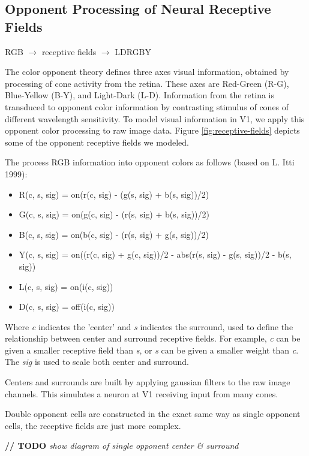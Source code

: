 \documentclass[journal,onecolumn]{IEEEtran}
\begin{document}
\subsection{Opponent Processing of Neural Receptive Fields}

RGB $\rightarrow$ receptive fields $\rightarrow$ LDRGBY

The color opponent theory defines three axes visual information, obtained by processing of cone activity from the retina. These axes are Red-Green (R-G), Blue-Yellow (B-Y), and Light-Dark (L-D). Information from the retina is transduced to opponent color information by contrasting stimulus of cones of different wavelength sensitivity. To model visual information in V1, we apply this opponent color processing to raw image data. Figure \ref{fig:receptive-fields} depicts some of the opponent receptive fields we modeled.

The process RGB information into opponent colors as follows (based on L. Itti 1999):
\begin{itemize}
    \item R(c, s, sig) = on(r(c, sig) - (g(s, sig) + b(s, sig))/2)
    \item G(c, s, sig) = on(g(c, sig) - (r(s, sig) + b(s, sig))/2)
    \item B(c, s, sig) = on(b(c, sig) - (r(s, sig) + g(s, sig))/2)
    \item Y(c, s, sig) = on((r(c, sig) + g(c, sig))/2 - abs(r(s, sig) - g(s, sig))/2 - b(s, sig))
    \item L(c, s, sig) = on(i(c, sig))
    \item D(c, s, sig) = off(i(c, sig))
\end{itemize}
Where \textit{c} indicates the 'center' and \textit{s} indicates the surround, used to define the relationship between center and surround receptive fields. For example, \textit{c} can be given a smaller receptive field than \textit{s}, or \textit{s} can be given a smaller weight than \textit{c}. The \textit{sig} is used to scale both center and surround. 

Centers and surrounds are built by applying gaussian filters to the raw image channels. This simulates a neuron at V1 receiving input from many cones.

Double opponent cells are constructed in the exact same way as single opponent cells, the receptive fields are just more complex.

\textbf{// TODO} \textit{show diagram of single opponent center \& surround}
\end{document}
